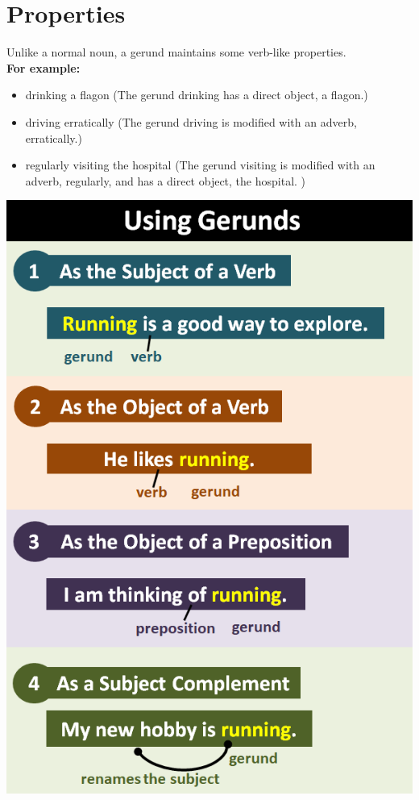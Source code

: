 \chapter{Properties}
Unlike a normal noun, a gerund maintains some verb-like properties.\\
\textbf{For example:} 
\begin{itemize}
    \item drinking a flagon (The gerund drinking has a direct object, a flagon.)
    \item driving erratically (The gerund driving is modified with an adverb, erratically.)
    \item regularly visiting the hospital (The gerund visiting is modified with an adverb, regularly, and has a direct object, the hospital. )
\end{itemize}
\begin{center}
    \includegraphics[scale=0.45]{project-folders/Gerunds/gerunds_use.png}
\end{center}
